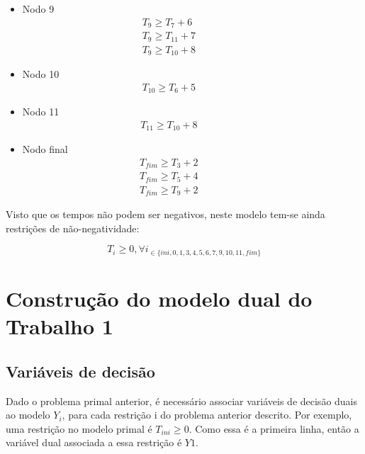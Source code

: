 \begin{itemize}
\item Nodo 9
\begin{align*}
T_9 \ge T_7 + 6   &         &         &         &         &         &\\
T_9 \ge T_{11} + 7 &         &         &         &         &         &\\
T_9 \ge T_{10} + 8 &         &         &         &         &         &
	\end{align*}


\item Nodo 10
\begin{align*}
		T_{10} \ge T_6 + 5 &         &         &         &         &         &
	\end{align*}

\item Nodo 11
\begin{align*}
		T_{11} \ge T_{10} + 8 &         &         &         &         &         &	
\end{align*}



\item Nodo final
\begin{align*}
		T_{fim} \ge T_3 + 2 &         &         &         &         &         &\\
T_{fim} \ge T_5 + 4 &         &         &         &         &         &\\
T_{fim} \ge T_9 + 2 &         &         &         &         &         &
	\end{align*}


\end{itemize}


Visto que os tempos não podem ser negativos, neste modelo tem-se ainda
restrições de não-negatividade:

\begin{displaymath} T_{i} \geq 0, \forall i_{\in\{ini, 0, 1, 3,
	4,5,6,7,9,10,11,fim\}} \end{displaymath}


\section{Construção do modelo dual do Trabalho 1}


\subsection{Variáveis de decisão}

Dado o problema primal anterior, é  necessário associar variáveis de decisão
duais ao modelo $Y_i$, para cada restrição i do problema anterior descrito. Por
exemplo, uma restrição no modelo primal é $T_{ini} \ge 0$. Como essa é a primeira
linha, então a variável dual associada a essa restrição é $Y1$.

